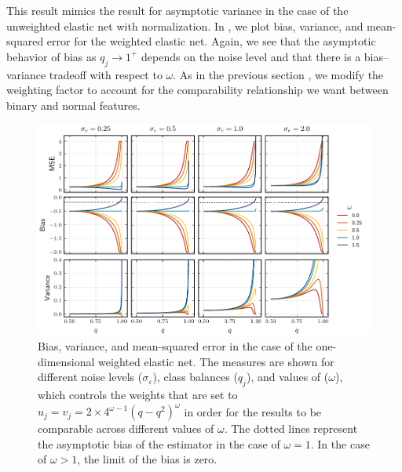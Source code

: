 This result mimics the result for asymptotic variance in the case of the unweighted elastic
net with normalization. In , we plot bias, variance,
and mean-squared error for the weighted elastic net. Again, we see that the asymptotic
behavior of bias as \(q_j \rightarrow 1^+\) depends on the noise level and that there is a
bias--variance tradeoff with respect to \(\omega\). As in the previous section
, we modify the weighting factor to account for the comparability
relationship we want between binary and normal features.

\begin{figure}[htpb]
  \centering
  \includegraphics[]{plots/binary_onedim_bias_var_elnet.pdf}
  \caption{%
    Bias, variance, and mean-squared error in the case of the one-dimensional weighted elastic
    net. The measures are shown for different noise levels (\(\sigma_\varepsilon\)), class
    balances (\(q_j\)), and values of (\(\omega\)), which controls the weights that are set to
    \(u_j = v_j = 2\times 4^{\omega - 1}(q-q^2)^\omega\) in order for the results to be
    comparable across different values of \(\omega\). The dotted lines represent the asymptotic
    bias of the estimator in the case of \(\omega = 1\). In the case of \(\omega > 1\), the
    limit of the bias is zero. \label{fig:binary-onedim-bias-var-elnet}
  }
\end{figure}
